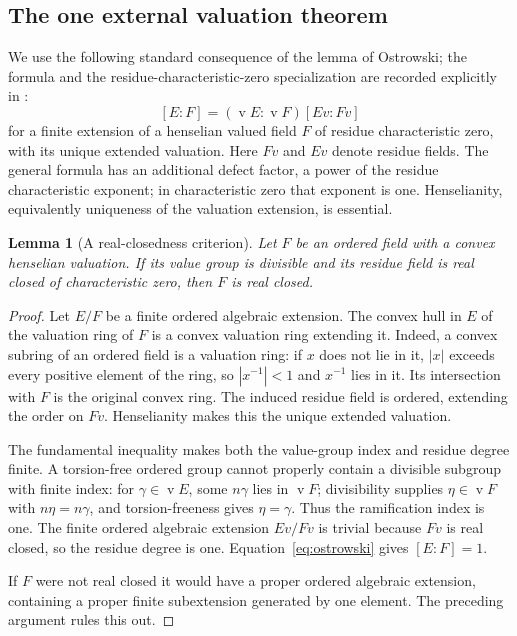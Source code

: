 \documentclass[11pt,letterpaper]{article}
\numberwithin{equation}{section}
\newtheorem{lemma}[theorem]{Lemma}
\theoremstyle{definition}
\theoremstyle{remark}
\newcommand{\val}{\operatorname{v}}
\begin{document}
\subsection{The one external valuation theorem}

We use the following standard consequence of the lemma of Ostrowski; the
formula and the residue-characteristic-zero specialization are recorded
explicitly in \cite[\S2.1, equation (1)]{rzepka}:
\begin{equation}\label{eq:ostrowski}
 [E:F]=(\val E:\val F)[Ev:Fv]
\end{equation}
for a finite extension of a henselian valued field $F$ of residue
characteristic zero, with its unique extended valuation. Here $Fv$ and
$Ev$ denote residue fields. The general formula has an additional defect
factor, a power of the residue characteristic exponent; in characteristic
zero that exponent is one. Henselianity, equivalently uniqueness of the
valuation extension, is essential.

\begin{lemma}[A real-closedness criterion]
\label{lem:valuationRC}
Let $F$ be an ordered field with a convex henselian valuation. If its value
group is divisible and its residue field is real closed of characteristic
zero, then $F$ is real closed.
\end{lemma}
\begin{proof}
Let $E/F$ be a finite ordered algebraic extension. The convex hull in $E$
of the valuation ring of $F$ is a convex valuation ring extending it.
Indeed, a convex subring of an ordered field is a valuation ring: if
$x$ does not lie in it, $|x|$ exceeds every positive element of the ring,
so $|x^{-1}|<1$ and $x^{-1}$ lies in it. Its intersection with $F$ is the
original convex ring. The induced residue field is ordered, extending the
order on $Fv$. Henselianity makes this the unique extended valuation.

The fundamental inequality makes both the value-group index and residue
degree finite. A torsion-free ordered group cannot properly contain a
divisible subgroup with finite index: for $\gamma\in\val E$, some
$n\gamma$ lies in $\val F$; divisibility supplies $\eta\in\val F$ with
$n\eta=n\gamma$, and torsion-freeness gives $\eta=\gamma$. Thus the
ramification index is one. The finite ordered algebraic extension $Ev/Fv$
is trivial because $Fv$ is real closed, so the residue degree is one.
Equation~\eqref{eq:ostrowski} gives $[E:F]=1$.

If $F$ were not real closed it would have a proper ordered algebraic
extension, containing a proper finite subextension generated by one element.
The preceding argument rules this out.
\end{proof}
\end{document}
